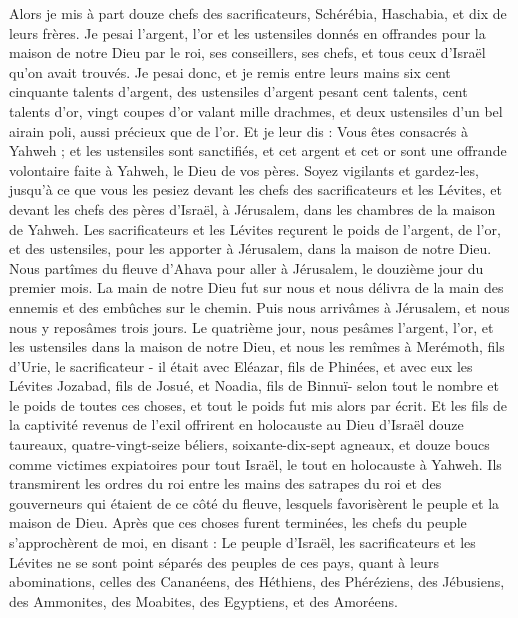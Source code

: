 \begin{multicols}{2}
Alors je mis à part douze chefs des sacrificateurs, Schérébia, Haschabia, et dix de leurs frères.
Je pesai l'argent, l'or et les ustensiles donnés en offrandes pour la maison de notre Dieu par le roi, ses conseillers, ses chefs, et tous ceux d'Israël qu'on avait trouvés.
Je pesai donc, et je remis entre leurs mains six cent cinquante talents d'argent, des ustensiles d'argent pesant cent talents, cent talents d'or,
vingt coupes d'or valant mille drachmes, et deux ustensiles d’un bel airain poli, aussi précieux que de l'or.
Et je leur dis : Vous êtes consacrés à Yahweh ; et les ustensiles sont sanctifiés, et cet argent et cet or sont une offrande volontaire faite à Yahweh, le Dieu de vos pères.
Soyez vigilants et gardez-les, jusqu'à ce que vous les pesiez devant les chefs des sacrificateurs et les Lévites, et devant les chefs des pères d'Israël, à Jérusalem, dans les chambres de la maison de Yahweh.
Les sacrificateurs et les Lévites reçurent le poids de l'argent, de l'or, et des ustensiles, pour les apporter à Jérusalem, dans la maison de notre Dieu.
Nous partîmes du fleuve d'Ahava pour aller à Jérusalem, le douzième jour du premier mois. La main de notre Dieu fut sur nous et nous délivra de la main des ennemis et des  embûches sur le chemin.
Puis nous arrivâmes à Jérusalem, et nous nous y reposâmes trois jours.
Le quatrième jour, nous pesâmes l'argent, l'or, et les ustensiles dans la maison de notre Dieu, et nous les remîmes à Merémoth, fils d'Urie, le sacrificateur - il était avec Eléazar, fils de Phinées, et avec eux les Lévites Jozabad, fils de Josué, et Noadia, fils de Binnuï-
 selon tout le nombre et le poids de toutes ces choses, et tout le poids fut mis alors par écrit.
Et les fils de la captivité revenus de l’exil offrirent en holocauste au Dieu d'Israël douze taureaux, quatre-vingt-seize béliers, soixante-dix-sept agneaux, et douze boucs comme victimes expiatoires pour tout Israël, le tout en holocauste à Yahweh.
Ils transmirent les ordres du roi entre les mains des satrapes du roi et des gouverneurs qui étaient de ce côté du fleuve, lesquels favorisèrent le peuple et la maison de Dieu.
\VerseOne{}Après que ces choses furent terminées, les chefs du peuple s'approchèrent de moi, en disant : Le peuple d'Israël,  les sacrificateurs et les Lévites ne se sont point séparés des peuples de ces pays, quant à leurs abominations, celles des Cananéens, des Héthiens, des Phéréziens, des Jébusiens, des Ammonites, des Moabites, des Egyptiens, et des Amoréens.

\end{multicols}
